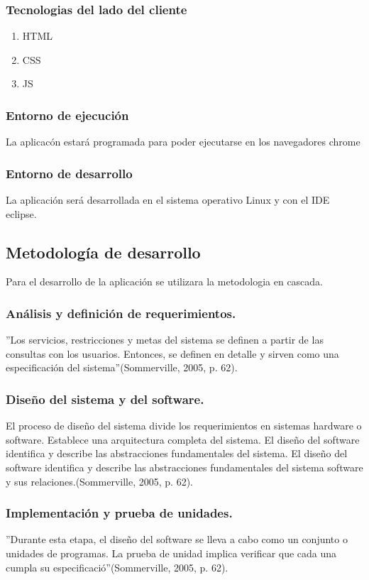 \documentclass[11pt,a4paper]{article}
\begin{document}
\subsubsection{Tecnologias del lado del cliente}
\begin{enumerate}
\item HTML
\item CSS
\item JS
\end{enumerate}
\subsubsection{Entorno de ejecución}
La aplicacón estará programada para poder ejecutarse en los navegadores chrome 
\subsubsection{Entorno de desarrollo}
La aplicación será desarrollada en el sistema operativo Linux y con el IDE eclipse.

\subsection{Metodología de desarrollo}
Para el desarrollo de la aplicación se utilizara la metodologia en cascada.

\subsubsection{Análisis y definición de requerimientos.}

''Los servicios, restricciones y metas del sistema se definen a partir de las consultas con los usuarios. Entonces, se definen en detalle y sirven como una especificación del sistema''(Sommerville, 2005, p. 62).

\subsubsection{Diseño del sistema y del software.}

El proceso de diseño del sistema divide los requerimientos en sistemas hardware o software. Establece una arquitectura completa del sistema. El diseño del software identifica y describe las abstracciones fundamentales del sistema. El diseño del software identifica y describe las abstracciones fundamentales del sistema software y sus relaciones.(Sommerville, 2005, p. 62).


\subsubsection{Implementación y prueba de unidades.}
''Durante esta etapa, el diseño del software se lleva a cabo como un conjunto o unidades de programas. La prueba de unidad implica verificar que cada una cumpla su especificació''(Sommerville, 2005, p. 62).
\end{document}
